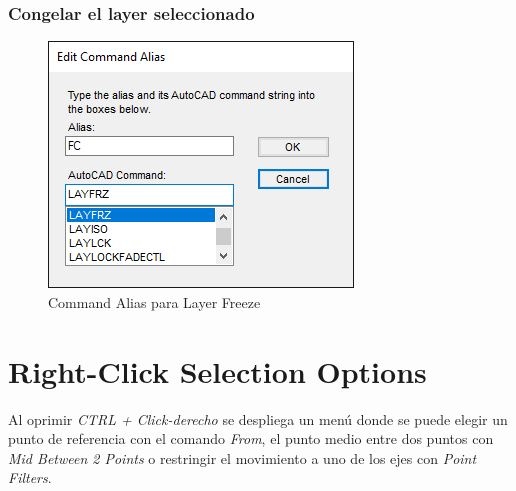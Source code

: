 \documentclass{report}
\begin{document}
\subsection{Congelar el layer seleccionado}

\begin{figure}[H]
	\centering
	\includegraphics[width=0.75\linewidth, height=0.45\textheight,keepaspectratio]{Imagenes/autocad_alias_layeroptions_04}
	\caption{Command Alias para Layer Freeze}
	\label{fig:autocadaliaslayeroptions04}
\end{figure}


\chapter{Right-Click Selection Options}

Al oprimir \emph{CTRL + Click-derecho} se despliega un menú donde se puede elegir un punto de referencia con el comando \emph{From}, el punto medio entre dos puntos con \emph{Mid Between 2 Points} o restringir el movimiento a uno de los ejes con \emph{Point Filters}.
\end{document}
